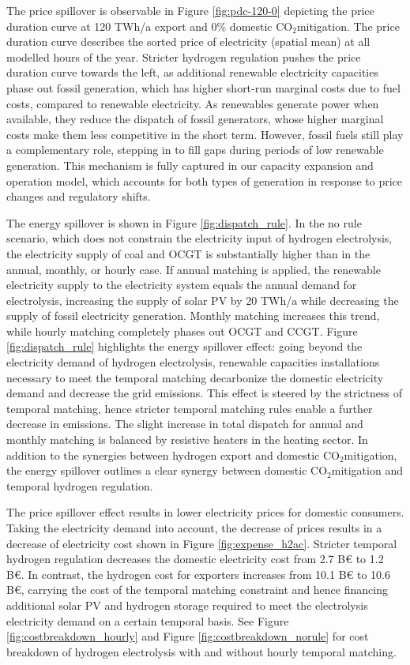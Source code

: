 \documentclass[5p,numafflabel]{elsarticle}
\newcommand{\co}{\ce{CO2}~}
\def\co{CO${}_2${\:}}
\begin{document}
The price spillover is observable in Figure \ref{fig:pdc-120-0} depicting the price duration curve at 120 TWh/a export and 0\% domestic \co mitigation. The price duration curve describes the sorted price of electricity (spatial mean) at all modelled hours of the year.
Stricter hydrogen regulation pushes the price duration curve towards the left, as additional renewable electricity capacities phase out fossil generation, which has higher short-run marginal costs due to fuel costs, compared to renewable electricity.
As renewables generate power when available, they reduce the dispatch of fossil generators, whose higher marginal costs make them less competitive in the short term. However, fossil fuels still play a complementary role, stepping in to fill gaps during periods of low renewable generation. This mechanism is fully captured in our capacity expansion and operation model, which accounts for both types of generation in response to price changes and regulatory shifts.


The energy spillover is shown in Figure \ref{fig:dispatch_rule}. In the no rule scenario, which does not constrain the electricity input of hydrogen electrolysis, the electricity supply of coal and OCGT is substantially higher than in the annual, monthly, or hourly case. If annual matching is applied, the renewable electricity supply to the electricity system equals the annual demand for electrolysis, increasing the supply of solar PV by 20 TWh/a while decreasing the supply of fossil electricity generation. 
Monthly matching increases this trend, while hourly matching completely phases out OCGT and CCGT. Figure \ref{fig:dispatch_rule} highlights the energy spillover effect: going beyond the electricity demand of hydrogen electrolysis, renewable capacities installations necessary to meet the temporal matching decarbonize the domestic electricity demand and decrease the grid emissions. This effect is steered by the strictness of temporal matching, hence stricter temporal matching rules enable a further decrease in emissions.
The slight increase in total dispatch for annual and monthly matching is balanced by resistive heaters in the heating sector.
In addition to the synergies between hydrogen export and domestic \co mitigation, the energy spillover outlines a clear synergy between domestic \co mitigation and temporal hydrogen regulation.



The price spillover effect results in lower electricity prices for domestic consumers. Taking the electricity demand into account, the decrease of prices results in a decrease of electricity cost shown in 
Figure \ref{fig:expense_h2ac}. Stricter temporal hydrogen regulation decreases the domestic electricity cost from 2.7 B€ to 1.2 B€. In contrast, the hydrogen cost for exporters increases from 10.1 B€ to 10.6 B€, carrying the cost of the temporal matching constraint and hence financing additional solar PV and hydrogen storage required to meet the electrolysis electricity demand on a certain temporal basis. See Figure \ref{fig:costbreakdown_hourly} and Figure \ref{fig:costbreakdown_norule} for cost breakdown of hydrogen electrolysis with and without hourly temporal matching.
\end{document}
